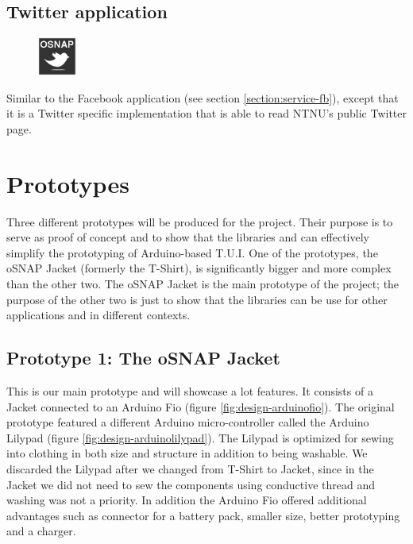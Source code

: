 \subsection{Twitter application}
\begin{figure}
	\centering \includegraphics[scale=1]{img/app-twitter}
\end{figure}
Similar to the Facebook application (see section \ref{section:service-fb}),
except that it is a Twitter specific implementation that is able to read NTNU's public Twitter page.

\section{Prototypes}
\label{sec:prototypes}
Three different prototypes will be produced for the project. Their purpose is to serve as proof of concept and
to show that the libraries and can effectively simplify the prototyping of Arduino-based T.U.I.
One of the prototypes, the oSNAP Jacket (formerly the T-Shirt), is significantly bigger and more complex than the other two.
The oSNAP Jacket is the main prototype of the project; the purpose of the other two
is just to show that the libraries can be use for other applications and in different contexts.

\subsection{Prototype 1: The oSNAP Jacket}
This is our main prototype and will showcase a lot features.
It consists of a Jacket connected to an Arduino Fio (figure \ref{fig:design-arduinofio}). The original prototype featured a different
Arduino micro-controller called the Arduino Lilypad (figure \ref{fig:design-arduinolilypad}). The Lilypad is optimized for sewing into 
clothing in both size and structure in addition to being washable. We discarded the Lilypad after we changed from T-Shirt to Jacket,
since in the Jacket we did not need to sew the components using conductive thread and washing was not a priority. In addition the 
Arduino Fio offered additional advantages such as connector for a battery pack, smaller size, better prototyping and a charger.

